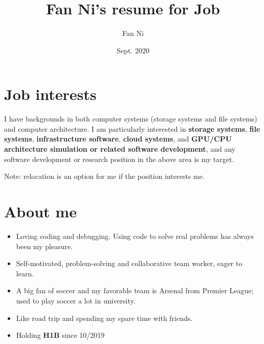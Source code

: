 \documentclass{article}
\title{Fan Ni's resume for Job}
\author{Fan Ni}
\date{Sept. 2020}
\begin{document}

\makecvtitle %

\section{Job interests}
I have backgrounds in both computer systems (storage systems and file systems) and computer architecture. I am particularly interested in \textbf{storage systems}, \textbf{file systems}, \textbf{infrastructure software}, \textbf{cloud systems}, and \textbf{GPU/CPU architecture simulation or related software development}, and any software development or research position in the above area is my target.

Note: relocation is an option for me if the position interests me.

\section{About me}
\begin{itemize}
    \item Loving coding and debugging. Using code to solve real problems has always been my pleasure. 
    \item Self-motivated, problem-solving and collaborative team worker, eager to learn.
    \item A big fan of soccer and my favorable team is Arsenal from Premier League; used to play soccer a lot in university. 
    \item Like road trip and spending my spare time with friends.
    \item Holding \textbf{H1B} since 10/2019
\end{itemize}
\end{document}
